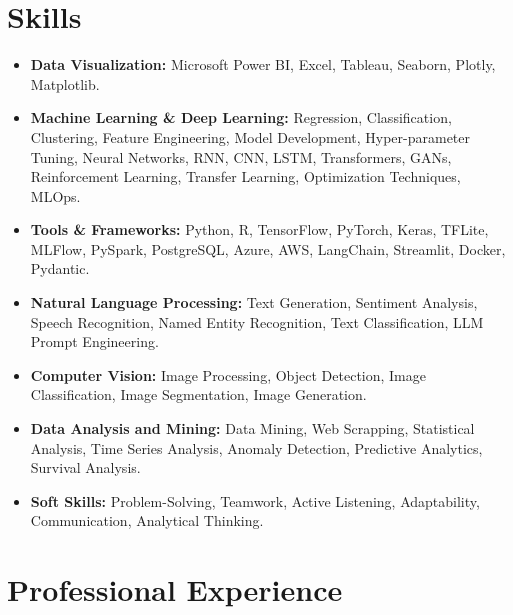 \documentclass[11pt,a4paper,sans]{moderncv}
\begin{document}
\section{Skills}
{\begin{itemize}[label=\textbullet]
\item {\textbf{Data Visualization:} Microsoft Power BI, Excel, Tableau, Seaborn, Plotly, Matplotlib.}
\item {\textbf{Machine Learning \& Deep Learning:}
Regression, Classification, Clustering,
Feature Engineering, Model Development, 
Hyper-parameter Tuning, 
Neural Networks,
RNN,
CNN,
LSTM,
Transformers,
GANs,
Reinforcement Learning,
Transfer Learning,
Optimization Techniques,
MLOps.}
\item {\textbf{Tools \& Frameworks:} 
Python,
R,
TensorFlow,
PyTorch,
Keras,
TFLite,
MLFlow,
PySpark,
PostgreSQL,
Azure,
AWS,
LangChain,
Streamlit,
Docker,
Pydantic.
}
\item {\textbf{Natural Language Processing:} Text Generation,
Sentiment Analysis,
Speech Recognition,
Named Entity Recognition,
Text Classification, LLM Prompt Engineering.}
\item {\textbf{Computer Vision:} Image Processing, Object Detection, Image Classification, Image Segmentation, Image Generation.}
\item {\textbf{Data Analysis and Mining:} Data Mining,
Web Scrapping,
Statistical Analysis,
Time Series Analysis,
Anomaly Detection,
Predictive Analytics,
Survival Analysis.}
\item {\textbf{Soft Skills:} Problem-Solving, Teamwork, Active Listening, Adaptability, Communication, Analytical Thinking.}
\end{itemize}}



\section{Professional Experience}
\end{document}
